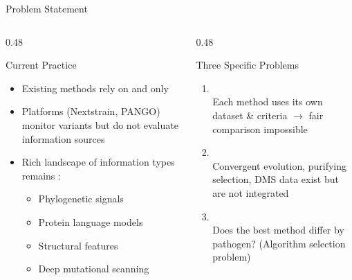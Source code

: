 \begin{frame}{Problem Statement}
  \begin{columns}[T]
    \begin{column}{0.48\textwidth}
      \begin{block}{Current Practice}
        \begin{itemize}
          \item Existing methods rely on  and  only
          \item Platforms (Nextstrain, PANGO) monitor variants but do not evaluate information sources
          \item Rich landscape of information types remains :
            \begin{itemize}
              \item Phylogenetic signals
              \item Protein language models
              \item Structural features
              \item Deep mutational scanning
            \end{itemize}
        \end{itemize}
      \end{block}
    \end{column}
    \begin{column}{0.48\textwidth}
      \begin{block}{Three Specific Problems}
        \begin{enumerate}
          \item {}\\
            {\small Each method uses its own dataset \& criteria $\rightarrow$ fair comparison impossible}
          \item {}\\
            {\small Convergent evolution, purifying selection, DMS data exist but are not integrated}
          \item {}\\
            {\small Does the best method differ by pathogen? (Algorithm selection problem)}
        \end{enumerate}
      \end{block}
    \end{column}
  \end{columns}
\end{frame}

